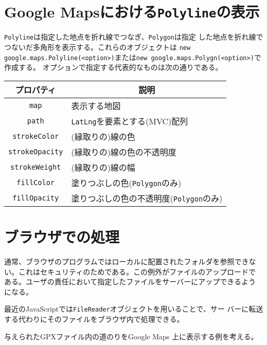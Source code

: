  \section{Google Mapsにおける\texttt{Polyline}の表示}
 \texttt{Polyline}は指定した地点を折れ線でつなぎ、\texttt{Polygon}は指定
 した地点を折れ線でつないだ多角形を表示する。これらのオブジェクトは
 \texttt{new google.maps.Polyline(<option>)}または\texttt{new
       google.maps.Polygn(<option>)}で作成する。
 オプションで指定する代表的なものは次の通りである。
\begin{center}
 \begin{tabular}{|c|p{}|}\hline
  プロパティ& \multicolumn{1}{c|}{説明}\\\hline
  \texttt{map}& 表示する地図\\ \hline
  \texttt{path}& \texttt{LatLng}を要素とする(MVC)配列\\ \hline
  \texttt{strokeColor}& (縁取りの)線の色\\ \hline
  \texttt{strokeOpacity}& (縁取りの)線の色の不透明度\\ \hline
  \texttt{strokeWeight}& (縁取りの)線の幅\\ \hline
  \texttt{fillColor}& 塗りつぶしの色(\texttt{Polygon}のみ)\\ \hline
  \texttt{fillOpacity}& 塗りつぶしの色の不透明度(\texttt{Polygon}のみ)\\ \hline
 \end{tabular}
\end{center}

 \section{ブラウザでの処理}
 通常、ブラウザのプログラムではローカルに配置されたフォルダを参照できな
 い。これはセキュリティのためである。この例外がファイルのアップロードで
 ある。ユーザの責任において指定したファイルをサーバーにアップできるよう
 になる。

 最近のJavaScriptでは\texttt{FileReader}オブジェクトを用いることで、サー
 バーに転送する代わりにそのファイルをブラウザ内で処理できる。

 与えられたGPXファイル内の道のりをGoogle Maps 上に表示する例を考える。

